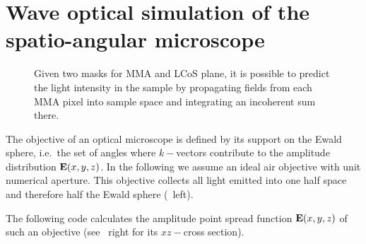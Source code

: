 \chapter{Wave optical simulation of the spatio-angular microscope}
\label{sec:sim-angle}
\begin{figure}[!hbt]
  \centering
  \def\svgscale{1.5}
  
  \caption{Given two masks for MMA and LCoS plane, it is possible to
    predict the light intensity in the sample by propagating fields
    from each MMA pixel into sample space and integrating an
    incoherent sum there.}
  \label{fig:memi-simple-app}
\end{figure}
The objective of an optical microscope is defined by its support on
the Ewald sphere, i.e.\ the set of angles where $k-$vectors contribute
to the amplitude distribution $\mathbf{E}(x,y,z)$. In the following we
assume an ideal air objective with unit numerical aperture. This
objective collects all light emitted into one half space and therefore
half the Ewald sphere (~left).

The following code calculates the amplitude point spread function
$\mathbf{E}(x,y,z)$ of such an objective (see
~right for its $xz-$cross section).

